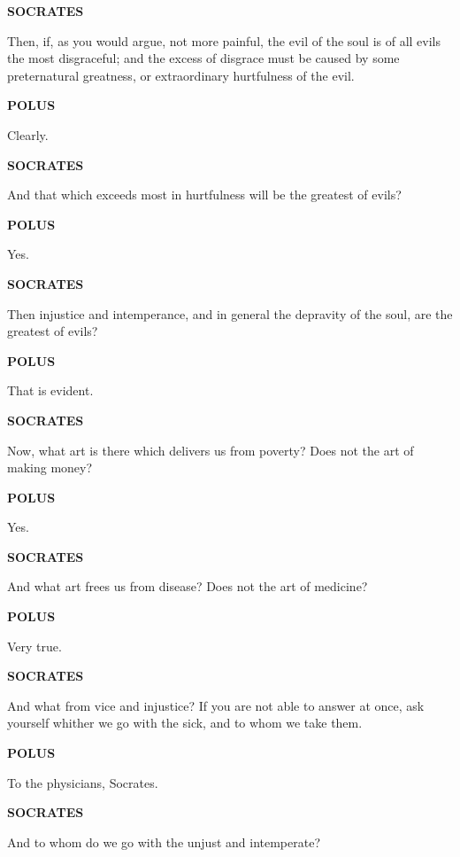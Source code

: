 \documentclass[11pt,letter]{article}
\begin{document}
\par \textbf{SOCRATES}
\par   Then, if, as you would argue, not more painful, the evil of the soul is of all evils the most disgraceful; and the excess of disgrace must be caused by some preternatural greatness, or extraordinary hurtfulness of the evil.

\par \textbf{POLUS}
\par   Clearly.

\par \textbf{SOCRATES}
\par   And that which exceeds most in hurtfulness will be the greatest of evils?

\par \textbf{POLUS}
\par   Yes.

\par \textbf{SOCRATES}
\par   Then injustice and intemperance, and in general the depravity of the soul, are the greatest of evils?

\par \textbf{POLUS}
\par   That is evident.

\par \textbf{SOCRATES}
\par   Now, what art is there which delivers us from poverty? Does not the art of making money?

\par \textbf{POLUS}
\par   Yes.

\par \textbf{SOCRATES}
\par   And what art frees us from disease? Does not the art of medicine?

\par \textbf{POLUS}
\par   Very true.

\par \textbf{SOCRATES}
\par   And what from vice and injustice? If you are not able to answer at once, ask yourself whither we go with the sick, and to whom we take them.

\par \textbf{POLUS}
\par   To the physicians, Socrates.

\par \textbf{SOCRATES}
\par   And to whom do we go with the unjust and intemperate?
\end{document}
